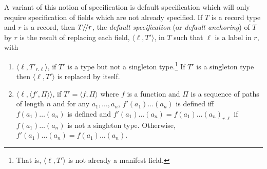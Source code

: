 A variant of this notion of specification is default specification
which will only require specification of fields which are not already
specified. If $T$ is a record type and $r$ is a record, then
$T/\!/ r$, the
\textit{default specification} (or \textit{default anchoring}) of $T$ by
$r$ is the result
of replacing each field, $\langle \ell, T'\rangle$, in $T$ such that
$\ell$ is a label in $r$, with 
\begin{enumerate}
\item  $\langle\ell,T'_{r.\ell}\rangle$, if
$T'$ is a type but not a singleton type.\footnote{That is, $\langle
  \ell, T'\rangle$ is not already a manifest field.} If $T'$ is a
singleton type then $\langle \ell, T'\rangle$ is replaced by itself.
\item $\langle\ell,\langle f',\Pi\rangle\rangle$, if $T'=\langle
  f,\Pi\rangle$ where $f$ is a function and $\Pi$ is a sequence of
  paths of length $n$ and for any
  $a_1,\ldots,a_n$, $f'(a_1)\ldots(a_n)$ is defined iff
  $f(a_1)\ldots(a_n)$ is defined and $f'(a_1)\ldots(a_n) =
  f(a_1)\ldots(a_n)_{r.\ell}$ if $f(a_1)\ldots(a_n)$ is not a
  singleton type. Otherwise, $f'(a_1)\ldots(a_n) =
  f(a_1)\ldots(a_n)$.
\end{enumerate}  

